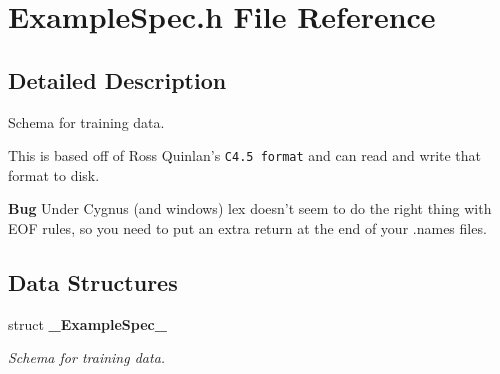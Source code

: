 \section{Example\-Spec.h File Reference}
\label{ExampleSpec_8h}


\subsection{Detailed Description}
Schema for training data. 

This is based off of Ross Quinlan's {\tt C4.5 format} and can read and write that format to disk.

\begin{Desc}
\item[{\bf Bug}]Under Cygnus (and windows) lex doesn't seem to do the right thing with EOF rules, so you need to put an extra return at the end of your .names files. \end{Desc}


\subsection*{Data Structures}
\begin{CompactItemize}
\item 
struct {\bf \_\-Example\-Spec\_\-}
\begin{CompactList}\small\item\em Schema for training data. \item\end{CompactList}\end{CompactItemize}
